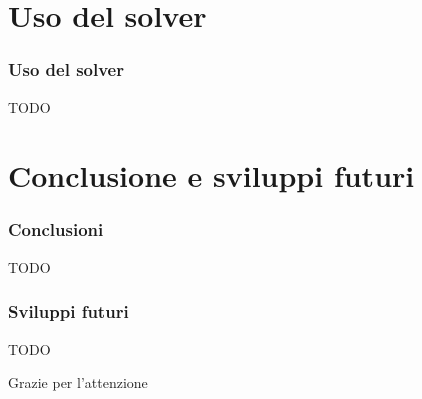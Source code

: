 \documentclass{beamer}
\begin{document}
\section{Uso del solver}

\begin{frame}
	\frametitle{Uso del solver}
	TODO
\end{frame}

\section{Conclusione e sviluppi futuri}

\begin{frame}
  \frametitle{Conclusioni}
  TODO
\end{frame}


\begin{frame}
  \frametitle{Sviluppi futuri}
  TODO
\end{frame}


\begin{frame}
  \Huge{\centerline{Grazie per l'attenzione}}
\end{frame}

\end{document}
